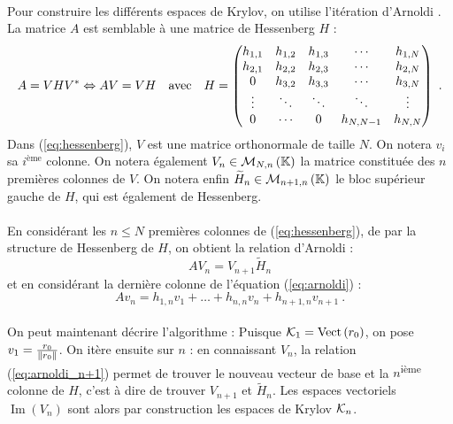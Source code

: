 	\paragraph{}
	Pour construire les différents espaces de Krylov, on utilise l'itération d'Arnoldi \cite{TrefethenBau1997}.
	La matrice $A$ est semblable à une matrice de Hessenberg $H$ :
	\begin{equation}\label{eq:hessenberg}
		A = VH{V}^*\Leftrightarrow AV = VH\quad\textrm{avec}\quad H=
		\begin{pmatrix}
			h_{1,1}&h_{1,2}&h_{1,3}&\cdots &h_{1,N}\\
			h_{2,1}&h_{2,2}&h_{2,3}&\cdots &h_{2,N}\\
			0      &h_{3,2}&h_{3,3}&\cdots &h_{3,N}\\
			\vdots &\ddots &\ddots &\ddots &\vdots \\
			0      &\cdots &0      &h_{N,N-1}&h_{N,N}
		\end{pmatrix}\ .
	\end{equation}
	Dans (\ref{eq:hessenberg}), $V$ est une matrice orthonormale de taille $N$.
	On notera $v_i$ sa $i^{\textrm{ème}}$ colonne.
	On notera également $V_n\in\mathcal{M}_{N, n}\left(\mathbb{K}\right)$ la matrice constituée des $n$ premières colonnes de $V$.
	On notera enfin $\widetilde{H}_n\in\mathcal{M}_{n+1, n}\left(\mathbb{K}\right)$ le bloc supérieur gauche de $H$, qui est également de Hessenberg.

	\paragraph{}
	En considérant les $n \le N$ premières colonnes de (\ref{eq:hessenberg}), de par la structure de Hessenberg de $H$, on obtient la relation d'Arnoldi :
	\begin{equation}\label{eq:arnoldi}
		AV_n = V_{n+1}\widetilde{H}_n
	\end{equation}
	et en considérant la dernière colonne de l'équation (\ref{eq:arnoldi}) :
	\begin{equation}\label{eq:arnoldi_n+1}
		Av_n = h_{1,n}v_1 + \dots + h_{n,n}v_n + h_{n+1,n}v_{n+1}\ .
	\end{equation}

	\paragraph{}
	On peut maintenant décrire l'algorithme :
	Puisque $\krylov{1} = \operatorname{Vect}\left(r_0\right)$, on pose $v_1 = \frac{r_0}{\norm{r_0}}$.
	On itère ensuite sur $n$ : en connaissant $V_n$, la relation (\ref{eq:arnoldi_n+1}) permet de trouver le nouveau vecteur de base et la $n$\textsuperscript{ième} colonne de $H$, c'est à dire de trouver $V_{n+1}$ et $\widetilde{H}_n$.
	Les espaces vectoriels $\operatorname{Im}\left(V_n\right)$ sont alors par construction les espaces de Krylov $\krylov{n}$.


